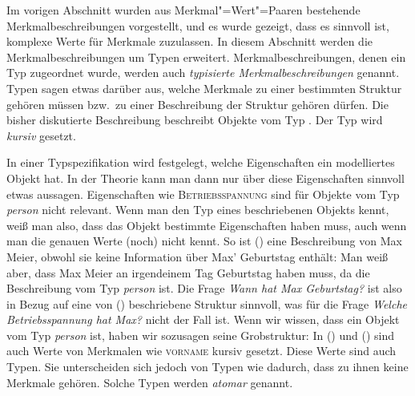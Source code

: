 Im vorigen Abschnitt wurden aus Merkmal"=Wert"=Paaren bestehende
Merkmalbeschreibungen vorgestellt, und es wurde gezeigt, dass es sinnvoll ist,
komplexe Werte für Merkmale zuzulassen.  In diesem Abschnitt werden die
Merkmalbeschreibungen um Typen erweitert. Merkmalbeschreibungen, denen ein Typ
zugeordnet wurde, werden auch \emph{typisierte Merkmalbeschreibungen} genannt.
Typen sagen etwas darüber aus, welche Merkmale zu einer
bestimmten Struktur gehören müssen bzw.\ zu einer Beschreibung der
Struktur gehören dürfen. Die bisher diskutierte Beschreibung beschreibt
Objekte vom Typ .
\ea
{}
\z
Der Typ wird \textit{kursiv} gesetzt. 

In einer Typspezifikation wird festgelegt, welche Eigenschaften ein modelliertes
Objekt hat. In der Theorie kann man dann nur über diese Eigenschaften sinnvoll etwas
aussagen. Eigenschaften wie \textsc{Betriebsspannung} sind für Objekte vom
Typ \textit{person} nicht relevant. Wenn man den Typ eines beschriebenen Objekts kennt,
weiß man also, dass das Objekt bestimmte Eigenschaften haben muss, auch wenn man
die genauen Werte (noch) nicht kennt. So ist () eine Beschreibung von
Max Meier, obwohl sie \zb keine Information über Max' Geburtstag enthält:
\ea
{}
\z
Man weiß aber, dass Max Meier an irgendeinem Tag Geburtstag haben muss, da die
Beschreibung vom Typ \textit{person} ist. Die Frage \emph{Wann hat Max Geburtstag?}
ist also in Bezug auf eine von () beschriebene Struktur sinnvoll, was für die Frage
\emph{Welche Betriebsspannung hat Max?} nicht der Fall ist. Wenn wir wissen, dass ein Objekt vom Typ
\textit{person} ist, haben wir sozusagen seine Grobstruktur:
\ea
{}
\z
In () und () sind auch Werte von Merkmalen wie \textsc{vorname} kursiv gesetzt. Diese Werte sind auch
Typen. Sie unterscheiden sich jedoch von Typen wie  dadurch, dass zu ihnen keine
Merkmale gehören. Solche Typen werden \emph{atomar} genannt.

